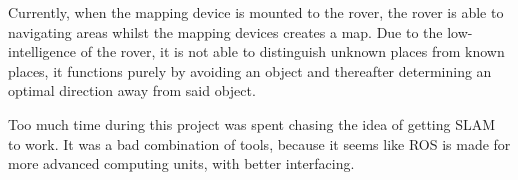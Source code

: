 

Currently, when the mapping device is mounted to the rover, the rover is able to navigating areas whilst the mapping devices creates a map. Due to the low-intelligence of the rover, it is not able to distinguish unknown places from known places, it functions purely by avoiding an object and thereafter determining an optimal direction away from said object.


Too much time during this project was spent chasing the idea of getting SLAM to work. It was a bad combination of tools, because it seems like ROS is made for more advanced computing units, with better interfacing. 


